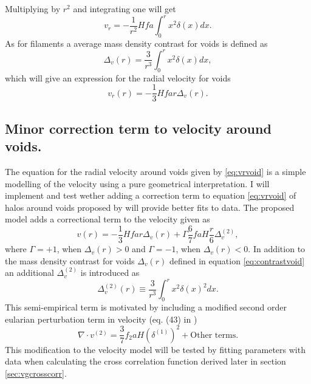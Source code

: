 Multiplying by $r^2$ and integrating one will get
\begin{equation}
    v_r = -\frac{1}{r^2}Hfa\int_0^r x^2\delta(x)dx.
\end{equation}
As for filaments a average mass density contrast for voids is defined as
\begin{equation}\label{eq:contrastvoid}
    \Delta_v(r)=\frac{3}{r^3}\int_0^r x^2\delta(x)dx,
\end{equation}
which will give an expression for the radial velocity for voids
\begin{equation}\label{eq:vrvoid}
    v_r(r)=-\frac{1}{3}Hfar\Delta_v(r).
\end{equation}
\subsection{Minor correction term to velocity around voids.}\label{sec:vr_correction}
The equation for the radial velocity around voids given by \ref{eq:vrvoid} is a simple modelling of the velocity using a pure geometrical interpretation. I will implement and test wether adding a correction term to equation \ref{eq:vrvoid} of halos around voids proposed by \cite{Achitouv_streaming} will provide better fits to data. The proposed model adds a correctional term to the velocity given as
\begin{equation}\label{eq:achitouv2017}
    v(r)=-\frac{1}{3}Hfar\Delta_v(r)+\Gamma\frac{6}{7}faH\frac{r}{6}\Delta_v^{(2)},
\end{equation}
where $\Gamma=+1$, when $\Delta_v(r)>0$ and $\Gamma=-1$, when $\Delta_v(r)<0$. In addition to the mass density contrast for voids $\Delta_v(r)$ defined in equation \ref{eq:contrastvoid} an additional $\Delta_v^{(2)}$ is introduced as 
\begin{equation}
    \Delta_v^{(2)}(r)\equiv\frac{3}{r^3}\int_0^rx^2\delta(x)^2dx.
\end{equation}
This semi-empirical term is motivated by including a modified second order eularian perturbation term in velocity (eq. (43) in \cite{Catelan_2ndordervelpert})
\begin{equation}
    \nabla\cdot v^{(2)}=\frac{3}{7}f_2aH(\delta^{(1)})^2+\text{Other terms}.
\end{equation}
This modification to the velocity model will be tested by fitting parameters with data when calculating the cross correlation function derived later in section \ref{sec:vgcrosscorr}.
